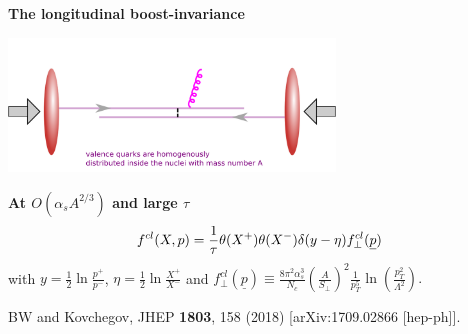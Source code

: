 \documentclass[9pt,a4paper,unknownkeysallowed,xcolor=dvipsnames,aspectratio=43]{beamer}
\begin{document}
%
\begin{frame}{\bf\huge The longitudinal boost-invariance}	\vspace{2mm}
\begin{center}
\includegraphics[width=0.65\textwidth]{fig/classical}\\
\end{center}
\vspace{2mm}
{\large\bf At $O(\alpha_s A^{2/3})$ and large $\tau$}
\begin{align}
  f^{cl}(X,p)=\frac{1}{\tau} \theta(X^+) \theta(X^-) \delta(y-\eta)
  f_\perp^{cl}(\underline{p})
  \notag
\end{align}
with $y = \frac{1}{2}\ln\frac{p^+}{p^-}$, $\eta = \frac{1}{2}\ln\frac{X^+}{X^-}$ and
$f_\perp^{cl}(\underline{p})\equiv\frac{8\pi^2\alpha_s^3}{N_c}\left(\frac{A}{S_\perp}\right)^2
  \frac{1}{p_T^5}\ln\left(\frac{p_T^2}{\Lambda^2}\right).$
  \vspace{2mm}
\begin{center}
    {\tiny  {\color{teablue}
  BW and Kovchegov,
  JHEP {\bf 1803}, 158 (2018)
  [arXiv:1709.02866 [hep-ph]].
}}
\end{center}

\end{frame}
\end{document}
